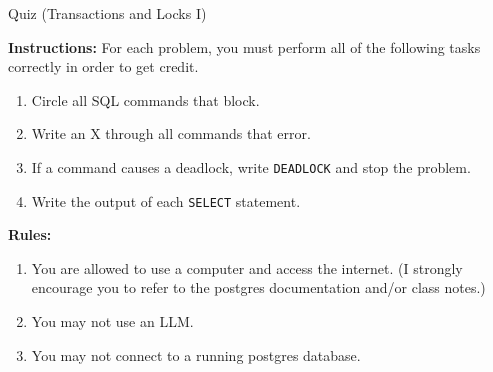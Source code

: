 \documentclass[10pt]{article}
\theoremstyle{definition}
\newcounter{ProblemCounter}
\newcommand{\nextproblem}{\filbreak\stepcounter{ProblemCounter} \noindent\textbf{Problem \theProblemCounter}:}
\begin{document}
\begin{center}
{
\Large
    Quiz (Transactions and Locks I)
}

    \vspace{0.1in}
\end{center}

\noindent
\textbf{Instructions:}
For each problem, you must perform all of the following tasks correctly in order to get credit.
\begin{enumerate}
\item Circle all SQL commands that block.
\item Write an X through all commands that error.
\item If a command causes a deadlock, write \lstinline{DEADLOCK} and stop the problem.
\item Write the output of each \lstinline{SELECT} statement.
\end{enumerate}
\textbf{Rules:}
\begin{enumerate}
    \item You are allowed to use a computer and access the internet.
        (I strongly encourage you to refer to the postgres documentation and/or class notes.)
    \item You may not use an LLM.
    \item You may not connect to a running postgres database.
\end{enumerate}

\vspace{1in}

%
%
%
%
%
%
%
%
%
%
%
%
%
%
%
\end{document}
